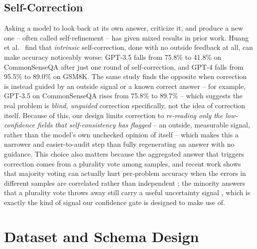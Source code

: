 \documentclass[conference]{IEEEtran}
\begin{document}
\subsection{Self-Correction}
Asking a model to look back at its own answer, criticize it, and produce a new one -- often called self-refinement -- has given mixed results in prior work. Huang et al.\ \cite{b3} find that \emph{intrinsic} self-correction, done with no outside feedback at all, can make accuracy noticeably worse: GPT-3.5 falls from 75.8\% to 41.8\% on CommonSenseQA after just one round of self-correction, and GPT-4 falls from 95.5\% to 89.0\% on GSM8K. The same study finds the opposite when correction is instead guided by an outside signal or a known correct answer -- for example, GPT-3.5 on CommonSenseQA rises from 75.8\% to 89.7\% -- which suggests the real problem is \emph{blind, unguided} correction specifically, not the idea of correction itself. Because of this, our design limits correction to \emph{re-reading only the low-confidence fields that self-consistency has flagged} -- an outside, measurable signal, rather than the model's own unchecked opinion of itself -- which makes this a narrower and easier-to-audit step than fully regenerating an answer with no guidance. This choice also matters because the aggregated answer that triggers correction comes from a plurality vote among samples, and recent work shows that majority voting can actually hurt per-problem accuracy when the errors in different samples are correlated rather than independent \cite{b22}; the minority answers that a plurality vote throws away still carry a useful uncertainty signal \cite{b23}, which is exactly the kind of signal our confidence gate is designed to make use of.

\section{Dataset and Schema Design}
\label{sec:data}
\end{document}
